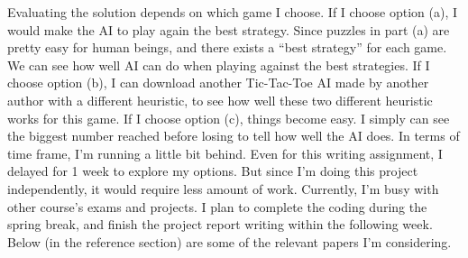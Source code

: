 \documentclass{article}
\begin{document}
\newline
\newline
Evaluating the solution depends on which game I choose. If I choose option (a), I would make the AI to play again the best strategy. Since puzzles in part (a) are pretty easy for human beings, and there exists a “best strategy” for each game. We can see how well AI can do when playing against the best strategies. If I choose option (b), I can download another Tic-Tac-Toe AI made by another author with a different heuristic, to see how well these two different heuristic works for this game. If I choose option (c), things become easy. I simply can see the biggest number reached before losing to tell how well the AI does.
\newline
\newline
In terms of time frame, I’m running a little bit behind. Even for this writing assignment, I delayed for 1 week to explore my options. But since I’m doing this project independently, it would require less amount of work. Currently, I’m busy with other course’s exams and projects. I plan to complete the coding during the spring break, and finish the project report writing within the following week.
\newline
\newline
Below (in the reference section) are some of the relevant papers I’m considering. \cite{ashraf2019ai} \cite{rodgers2014investigation}
\newline



\end{document}
